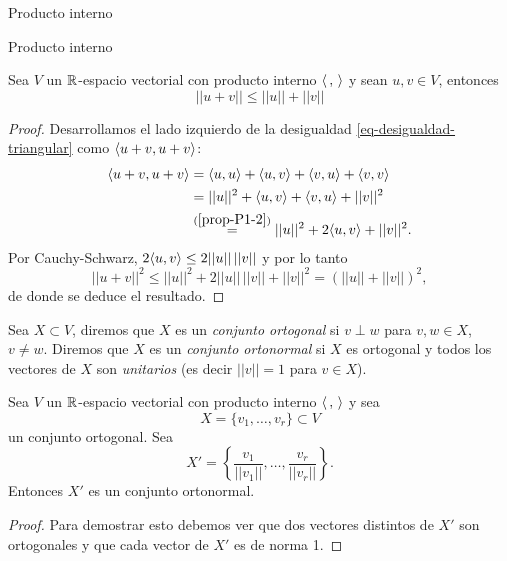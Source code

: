 \begin{chapter}{Producto interno}
\begin{section}{Producto interno}
        \begin{teorema} Sea $V$  un $\mathbb R$-espacio vectorial con producto interno $\langle \,,\,\rangle$ y sean $u, v\in V$, entonces 
            \begin{equation} \label{eq-desigualdad-triangular}
                ||u + v|| \le ||u|| + ||v||
            \end{equation}
        \end{teorema}
        \begin{proof}
            Desarrollamos el lado izquierdo de la desigualdad \eqref{eq-desigualdad-triangular} como $\langle u+v, u+v \rangle$:
            \begin{align*}
                \langle u+v, u+v \rangle &= \langle u, u \rangle + \langle u, v \rangle +\langle v, u \rangle +\langle v, v \rangle \\
                &= ||u||^2+ \langle u, v \rangle +\langle v, u \rangle +||v||^2\\
                &\stackrel{(\ref{prop-P1-2})}{=} ||u||^2+ 2\langle u, v \rangle +||v||^2.
            \end{align*}
            Por  Cauchy-Schwarz, $2\langle u, v \rangle \le 2||u||\,||v||$ y por lo tanto\begin{equation*}
                ||u + v||^2 \le ||u||^2+2||u||\,||v|| +||v||^2 = (||u||+||v||)^2,
            \end{equation*}
            de donde se deduce el resultado. 
        \end{proof}
        
        \begin{definicion} Sea $X \subset V$, diremos que $X$ es un \textit{conjunto ortogonal} si $v\perp w$ para $v,w \in X$, $v\not= w$. Diremos que $X$ es un \textit{conjunto ortonormal} si $X$ es ortogonal y todos los vectores de $X$ son  \textit{unitarios} (es decir $||v|| =1$ para $v \in X$).
        \end{definicion}
        
        \begin{proposicion}\label{ortogonal->ortonormal} Sea $V$  un $\mathbb R$-espacio vectorial con producto interno $\langle \,,\,\rangle$ y sea  
            $$X = \{v_1,\ldots,v_r \} \subset V$$ 
            un conjunto ortogonal. Sea 
            \begin{equation*}
                X' =  \left\{\frac{v_1}{||v_1||},\ldots,\frac{v_r}{||v_r||} \right\}.
            \end{equation*}
            Entonces $X'$ es  un conjunto ortonormal. 
        \end{proposicion}
        \begin{proof}
            Para demostrar esto debemos ver que dos vectores distintos de $X'$ son ortogonales y que cada vector de $X'$ es de norma 1.
            

\end{proof}
\end{section}
\end{chapter}
